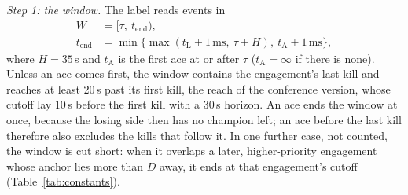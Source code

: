 \emph{Step 1: the window.} The label reads events in
\begin{align}
W &= [\tau,\ t_{\mathrm{end}}), \label{eq:label-window}\\
t_{\mathrm{end}} &= \min\{\max(t_{\mathrm{L}} + 1\,\mathrm{ms},\ \tau + H),\ t_{\mathrm{A}} + 1\,\mathrm{ms}\}, \nonumber
\end{align}
where $H = 35$\,s and $t_{\mathrm{A}}$ is the first ace at or after $\tau$ ($t_{\mathrm{A}} = \infty$
if there is none). Unless an ace comes first, the window contains the engagement's last kill and
reaches at least 20\,s past its first kill, the reach of the conference version, whose cutoff lay
10\,s before the first kill with a 30\,s horizon. An ace ends the window at once, because the losing
side then has no champion left; an ace before the last kill therefore also excludes the kills that
follow it. In one further case, not counted, the window is cut short: when it overlaps a later,
higher-priority engagement whose anchor lies more than $D$ away, it ends at that engagement's cutoff
(Table~\ref{tab:constants}).

